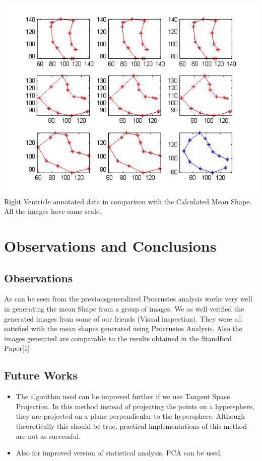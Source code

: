 \documentclass[paper=a4, fontsize=11pt,twoside]{scrartcl}	%
\begin{document}
\includegraphics{HeartSubplot.png}
Right Ventricle annotated data in comparison with the Calculated Mean Shape. All the images have same scale.

\section{Observations and Conclusions}
\subsection{Observations}
As can be seen from the previousgeneralized Procrustes analysis works very well in generating the mean Shape from a group of images. We as well verified the generated images from some of our friends (Visual inspection). They were all satisfied with the mean shapes generated using Procrustes Analysis. Also the images generated are comparable to the results obtained in the Standford Paper[1]

\subsection{Future Works}
\begin{itemize}
\item The algorithm used can be improved further if we use Tangent Space Projection. In this method instead of projecting the points on a hypersphere, they are projected on a plane perpendicular to the hypersphere. Although theorotically this should be true, practical implementations of this method are not as successful.
\item Also for improved version of statistical analysis, PCA can be used.
\end{itemize}
\end{document}
